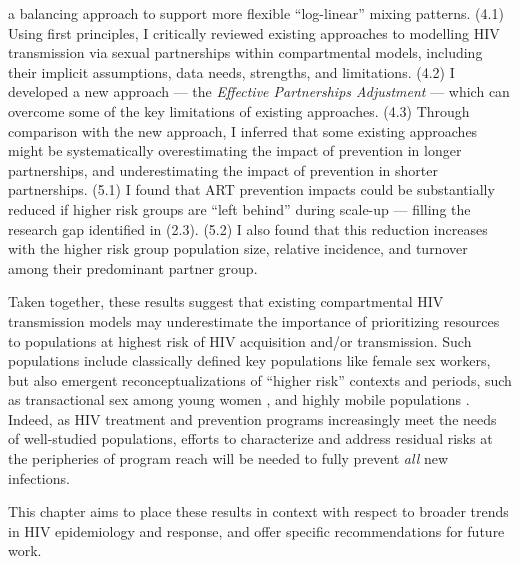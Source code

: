 a balancing approach to support more flexible ``log-linear'' mixing patterns.
\pagebreak %
(4.1) Using first principles, I critically reviewed existing approaches to
modelling HIV transmission via sexual partnerships within compartmental models,
including their implicit assumptions, data needs, strengths, and limitations.
(4.2) I developed a new approach --- the \emph{Effective Partnerships Adjustment} ---
which can overcome some of the key limitations of existing approaches.
(4.3) Through comparison with the new approach, I inferred that
some existing approaches might be systematically
overestimating the impact of prevention in longer partnerships, and
underestimating the impact of prevention in shorter partnerships.
(5.1) I found that ART prevention impacts could be substantially reduced
if higher risk groups are ``left behind'' during scale-up
--- filling the research gap identified in (2.3).
(5.2) I also found that this reduction increases with the higher risk group
population size, relative incidence, and turnover among their predominant partner group.
\par
Taken together, these results suggest that existing compartmental HIV transmission models
may underestimate the importance of prioritizing resources to
populations at highest risk of HIV acquisition and/or transmission.
Such populations include classically defined key populations like female sex workers,
but also emergent reconceptualizations of ``higher risk'' contexts and periods,
such as transactional sex among young women \cite{Wamoyi2016,Cheuk2020},
and highly mobile populations \cite{Akullian2017}.
Indeed, as HIV treatment and prevention programs
increasingly meet the needs of well-studied populations,
efforts to characterize and address residual risks at the peripheries of program reach
will be needed to fully prevent \emph{all} new infections.
\par
This chapter aims to place these results in context with respect to
broader trends in HIV epidemiology and response,
and offer specific recommendations for future work.
